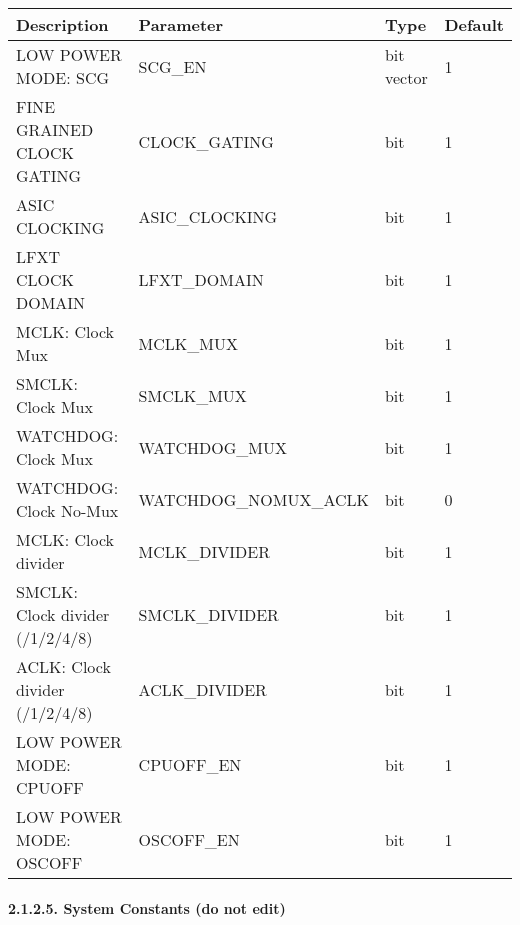 \documentclass[]{article}
\let\oldparagraph\paragraph
\renewcommand{\paragraph}[1]{\oldparagraph{#1}\mbox{}}
\begin{document}
\begin{longtable}[]{@{}llll@{}}
\toprule
Description & Parameter & Type & Default\tabularnewline
\midrule
\endhead
LOW POWER MODE: SCG & SCG\_EN & bit vector & 1\tabularnewline
FINE GRAINED CLOCK GATING & CLOCK\_GATING & bit & 1\tabularnewline
ASIC CLOCKING & ASIC\_CLOCKING & bit & 1\tabularnewline
LFXT CLOCK DOMAIN & LFXT\_DOMAIN & bit & 1\tabularnewline
MCLK: Clock Mux & MCLK\_MUX & bit & 1\tabularnewline
SMCLK: Clock Mux & SMCLK\_MUX & bit & 1\tabularnewline
WATCHDOG: Clock Mux & WATCHDOG\_MUX & bit & 1\tabularnewline
WATCHDOG: Clock No-Mux & WATCHDOG\_NOMUX\_ACLK & bit & 0\tabularnewline
MCLK: Clock divider & MCLK\_DIVIDER & bit & 1\tabularnewline
SMCLK: Clock divider (/1/2/4/8) & SMCLK\_DIVIDER & bit &
1\tabularnewline
ACLK: Clock divider (/1/2/4/8) & ACLK\_DIVIDER & bit & 1\tabularnewline
LOW POWER MODE: CPUOFF & CPUOFF\_EN & bit & 1\tabularnewline
LOW POWER MODE: OSCOFF & OSCOFF\_EN & bit & 1\tabularnewline
\bottomrule
\end{longtable}

\paragraph{2.1.2.5. System Constants (do not
edit)}\label{system-constants-do-not-edit}
\end{document}
